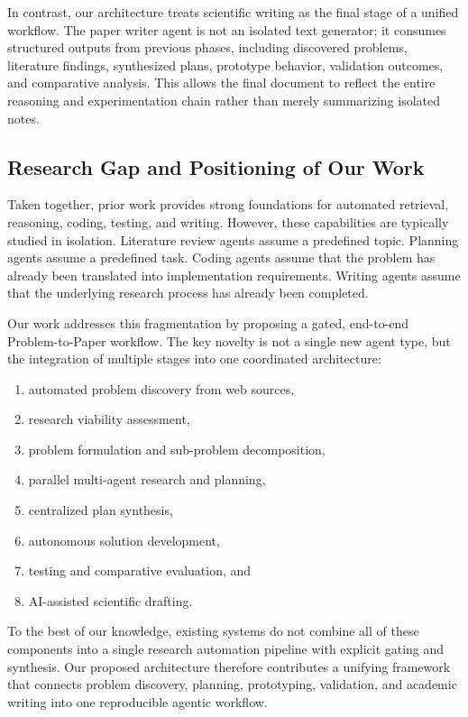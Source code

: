 \documentclass[11pt,a4paper]{article}
\begin{document}
In contrast, our architecture treats scientific writing as the final stage of a unified workflow. The paper writer agent is not an isolated text generator; it consumes structured outputs from previous phases, including discovered problems, literature findings, synthesized plans, prototype behavior, validation outcomes, and comparative analysis. This allows the final document to reflect the entire reasoning and experimentation chain rather than merely summarizing isolated notes.

\subsection{Research Gap and Positioning of Our Work}

Taken together, prior work provides strong foundations for automated retrieval, reasoning, coding, testing, and writing. However, these capabilities are typically studied in isolation. Literature review agents assume a predefined topic. Planning agents assume a predefined task. Coding agents assume that the problem has already been translated into implementation requirements. Writing agents assume that the underlying research process has already been completed.

Our work addresses this fragmentation by proposing a gated, end-to-end Problem-to-Paper workflow. The key novelty is not a single new agent type, but the integration of multiple stages into one coordinated architecture:
\begin{enumerate}
    \item automated problem discovery from web sources,
    \item research viability assessment,
    \item problem formulation and sub-problem decomposition,
    \item parallel multi-agent research and planning,
    \item centralized plan synthesis,
    \item autonomous solution development,
    \item testing and comparative evaluation, and
    \item AI-assisted scientific drafting.
\end{enumerate}

To the best of our knowledge, existing systems do not combine all of these components into a single research automation pipeline with explicit gating and synthesis. Our proposed architecture therefore contributes a unifying framework that connects problem discovery, planning, prototyping, validation, and academic writing into one reproducible agentic workflow.
\end{document}
